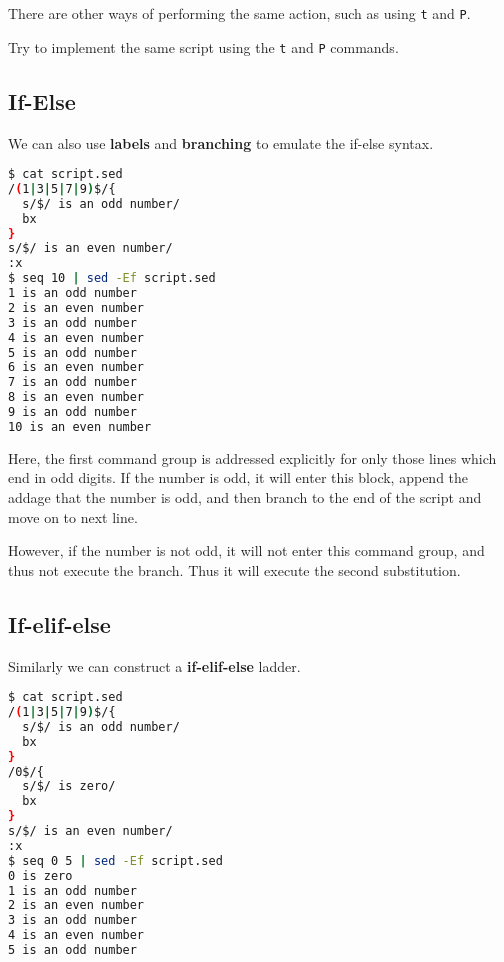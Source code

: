 There are other ways of performing the same action, such as using \lstinline|t| and \lstinline|P|.

\begin{exercise}
  Try to implement the same script using the \lstinline|t| and \lstinline|P| commands.
\end{exercise}

\subsection{If-Else}

We can also use \textbf{labels} and \textbf{branching} to emulate the if-else syntax.

\begin{lstlisting}[language=bash]
$ cat script.sed
/(1|3|5|7|9)$/{
  s/$/ is an odd number/
  bx
}
s/$/ is an even number/
:x
$ seq 10 | sed -Ef script.sed
1 is an odd number
2 is an even number
3 is an odd number
4 is an even number
5 is an odd number
6 is an even number
7 is an odd number
8 is an even number
9 is an odd number
10 is an even number
\end{lstlisting}

Here, the first command group is addressed explicitly for only those lines which end in odd digits. If the number is odd, it will enter this block, append the addage that the number is odd, and then branch to the end of the script and move on to next line.

However, if the number is not odd, it will not enter this command group, and thus not execute the branch. Thus it will execute the second substitution.

\subsection{If-elif-else}

Similarly we can construct a \textbf{if-elif-else} ladder.

\begin{lstlisting}[language=bash]
$ cat script.sed
/(1|3|5|7|9)$/{
  s/$/ is an odd number/
  bx
}
/0$/{
  s/$/ is zero/
  bx
}
s/$/ is an even number/
:x
$ seq 0 5 | sed -Ef script.sed
0 is zero
1 is an odd number
2 is an even number
3 is an odd number
4 is an even number
5 is an odd number
\end{lstlisting}
